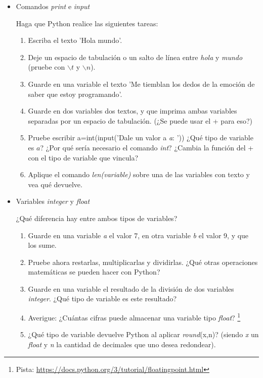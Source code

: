 \documentclass[a4paper]{article}
\begin{document}
\begin{itemize}

\item Comandos \textit{print} e \textit{input}

Haga que Python realice las siguientes tareas:

\begin{enumerate}
 \item Escriba el texto 'Hola mundo'.
 \item Deje un espacio de tabulación o un salto de línea entre \textit{hola} y \textit{mundo} (pruebe con $\backslash t$ y $\backslash n$).

 \item Guarde en una variable el texto 'Me tiemblan los dedos de la emoción de saber que estoy programando'.
 \item Guarde en dos variables dos textos, y que imprima ambas variables separadas por un espacio de tabulación. (¿Se puede usar el + para eso?)
 \item Pruebe escribir a=int(input('Dale un valor a \textit{a}: ')) ¿Qué tipo de variable es $a$? ¿Por qué sería necesario el comando \textit{int}? ¿Cambia la función del + con el tipo de variable que vincula?
 \item Aplique el comando \textit{len(variable)} sobre una de las variables con texto y vea qué devuelve.
\end{enumerate}


\item Variables \textit{integer} y \textit{float}

¿Qué diferencia hay entre ambos tipos de variables?

\begin{enumerate}
 \item Guarde en una variable \textit{a} el valor 7, en otra variable \textit{b} el valor 9, y que los sume.
 \item Pruebe ahora restarlas, multiplicarlas y dividirlas. ¿Qué otras operaciones matemáticas se pueden hacer con Python?
 \item Guarde en una variable el resultado de la división de dos variables \textit{integer}. ¿Qué tipo de variable es este resultado?
 \item Averigue: ¿Cuántas cifras puede almacenar una variable tipo \textit{float}? \footnote{Pista: \url{https://docs.python.org/3/tutorial/floatingpoint.html}}
 \item ¿Qué tipo de variable devuelve Python al aplicar \textit{round}(x,n)? (siendo \textit{x} un \textit{float} y \textit{n} la cantidad de decimales que uno desea redondear).
\end{enumerate}



\end{itemize}
\end{document}
